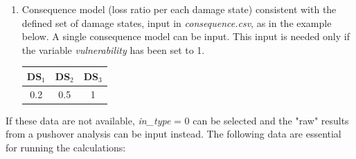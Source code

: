 \begin{enumerate}
\item Consequence model (loss ratio per each damage state) consistent with the defined set of damage states, input in \textit{consequence.csv}, as in the example below. A single consequence model can be input. This input is needed only if the variable \textit{vulnerability} has been set to 1.	
	\begin{table}[H]
	\centering
	\begin{tabular}{|c|c|c|} \hline
	\textbf{DS$_1$} & \textbf{DS$_2$} & \textbf{DS$_3$} \\ \hline
	0.2	& 0.5	 & 1\\ \hline
	\end{tabular}
	\end{table}
	
\end{enumerate}

If these data are not available, \textit{in\_type} = 0 can be selected and the "raw" results from a pushover analysis can be input instead. The following data are essential for running the calculations:

